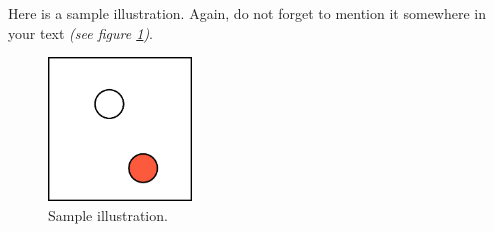 \documentclass[journal]{vgtc}                %
\begin{document}
Here is a sample illustration. Again, do not forget to mention it somewhere in your text \textit{(see figure \ref{fig:sampleimage})}.
\begin{figure}[htb]
  \centering
  \includegraphics[width=1.5in]{sample}
  \caption{Sample illustration.}
  \label{fig:sampleimage}
\end{figure}

%
\printbibliography
\end{document}
